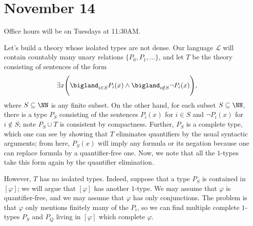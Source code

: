 \documentclass[../notes.tex]{subfiles}
\begin{document}
\section{November 14}

Office hours will be on Tuesdays at 11:30AM.
\begin{example}
	Let's build a theory whose isolated types are not dense. Our language $\mathcal L$ will contain countably many unary relations $\{P_0,P_1,\ldots\}$, and let $T$ be the theory consisting of sentences of the form
	\[\exists x\Bigg(\bigland_{i\in S}P_i(x)\land\bigland_{i\notin S}\lnot P_i(x)\Bigg),\]
	where $S\subseteq\NN$ is any finite subset. On the other hand, for each subset $S\subseteq\NN$, there is a type $P_S$ consisting of the sentences $P_i(x)$ for $i\in S$ and $\lnot P_i(x)$ for $i\notin S$; note $P_S\cup T$ is consistent by compactness. Further, $P_S$ is a complete type, which one can see by showing that $T$ eliminates quantifiers by the usual syntactic arguments; from here, $P_S(x)$ will imply any formula or its negation because one can replace formula by a quantifier-free one. Now, we note that all the $1$-types take this form again by the quantifier elimination.

	However, $T$ has no isolated types. Indeed, suppose that a type $P_S$ is contained in $[\varphi]$; we will argue that $[\varphi]$ has another $1$-type. We may assume that $\varphi$ is quantifier-free, and we may assume that $\varphi$ has only conjunctions. The problem is that $\varphi$ only mentions finitely many of the $P_i$, so we can find multiple complete $1$-types $P_S$ and $P_Q$ living in $[\varphi]$ which complete $\varphi$.
\end{example}
\end{document}
